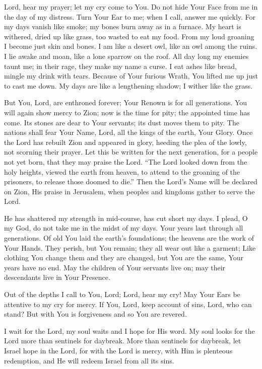 Lord, hear my prayer;
let my cry come to You.
Do not hide Your Face from me in the day of my distress.
Turn Your Ear to me;
when I call, answer me quickly.
For my days vanish like smoke;
my bones burn away as in a furnace.
My heart is withered, dried up like grass, too wasted to eat my food.
From my loud groaning I become just skin and bones.
I am like a desert owl, like an owl among the ruins.
I lie awake and moan, like a lone sparrow on the roof.
All day long my enemies taunt me;
in their rage, they make my name a curse.
I eat ashes like bread, mingle my drink with tears.
Because of Your furious Wrath, You lifted me up just to cast me down.
My days are like a lengthening shadow;
I wither like the grass.

But You, Lord, are enthroned forever;
Your Renown is for all generations.
You will again show mercy to Zion;
now is the time for pity;
the appointed time has come.
Its stones are dear to Your servants;
its dust moves them to pity.
The nations shall fear Your Name, Lord,
all the kings of the earth, Your Glory.
Once the Lord has rebuilt Zion and appeared in glory, heeding the plea of the lowly, not scorning their prayer.
Let this be written for the next generation, for a people not yet born, that they may praise the Lord.
``The Lord looked down from the holy heights, viewed the earth from heaven, to attend to the groaning of the prisoners, to release those doomed to die.''
Then the Lord's Name will be declared on Zion, His praise in Jerusalem, when peoples and kingdoms gather to serve the Lord.

He has shattered my strength in mid-course, has cut short my days.
I plead, O my God, do not take me in the midst of my days.
Your years last through all generations.
Of old You laid the earth's foundations;
the heavens are the work of Your Hands.
They perish, but You remain;
they all wear out like a garment;
Like clothing You change them and they are changed, but You are the same, Your years have no end.
May the children of Your servants live on;
may their descendants live in Your Presence.

Out of the depths I call to You, Lord;
Lord, hear my cry!
May Your Ears be attentive to my cry for mercy.
If You, Lord, keep account of sins, Lord, who can stand?
But with You is forgiveness and so You are revered.

I wait for the Lord, my soul waits and I hope for His word.
My soul looks for the Lord more than sentinels for daybreak.
More than sentinels for daybreak, let Israel hope in the Lord, for with the Lord is mercy, with Him is plenteous redemption, and He will redeem Israel from all its sins.

